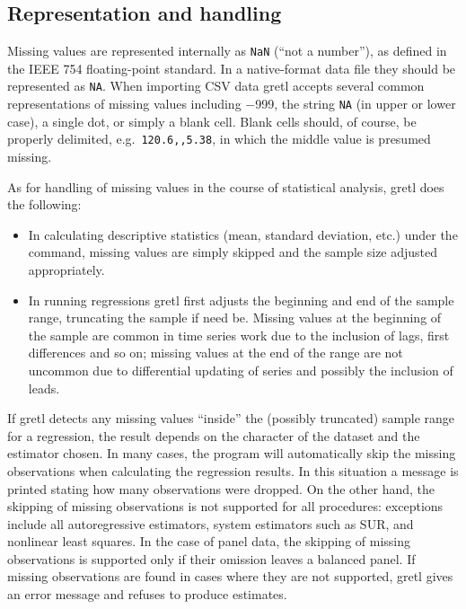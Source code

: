 \subsection{Representation and handling}

Missing values are represented internally as \verb+NaN+ (``not a
number''), as defined in the IEEE 754 floating-point standard. In a
native-format data file they should be represented as \verb+NA+. When
importing CSV data gretl accepts several common representations of
missing values including $-$999, the string \verb+NA+ (in upper or
lower case), a single dot, or simply a blank cell.  Blank cells
should, of course, be properly delimited, e.g.\ \verb+120.6,,5.38+, in
which the middle value is presumed missing.

As for handling of missing values in the course of statistical
analysis, gretl does the following:

\begin{itemize}
\item In calculating descriptive statistics (mean, standard deviation,
  etc.) under the  command, missing values are simply
  skipped and the sample size adjusted appropriately.
\item In running regressions gretl first adjusts the beginning
  and end of the sample range, truncating the sample if need be.
  Missing values at the beginning of the sample are common in time
  series work due to the inclusion of lags, first differences and so
  on; missing values at the end of the range are not uncommon due to
  differential updating of series and possibly the inclusion of leads.
\end{itemize}

If gretl detects any missing values ``inside'' the (possibly
truncated) sample range for a regression, the result depends on the
character of the dataset and the estimator chosen.  In many cases, the
program will automatically skip the missing observations when
calculating the regression results.  In this situation a message is
printed stating how many observations were dropped.  On the other
hand, the skipping of missing observations is not supported for all
procedures: exceptions include all autoregressive estimators, system
estimators such as SUR, and nonlinear least squares.  In the case of
panel data, the skipping of missing observations is supported only if
their omission leaves a balanced panel. If missing observations are
found in cases where they are not supported, gretl gives an
error message and refuses to produce estimates.

